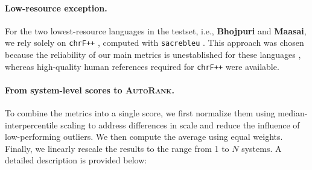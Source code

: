 \documentclass[11pt]{article}
\newcommand{\auto}{\textsc{AutoRank}}
\begin{document}
\paragraph{Low-resource exception.}
For the two lowest-resource languages in the testset, i.e., \textbf{Bhojpuri} and \textbf{Maasai}, we rely solely on \texttt{chrF++} \citep{popovic-2017-chrf}, computed with \texttt{sacrebleu} \citep{post-2018-call}. This approach was chosen because the reliability of our main metrics is unestablished for these languages \citep{falcao-etal-2024-comet,singh-etal-2024-good,wang-etal-2024-evaluating,sindhujan-etal-2025-llms}, whereas high-quality human references required for \texttt{chrF++} were available.

\paragraph{From system-level scores to \auto.}
To combine the metrics into a single score, we first normalize them using median-interpercentile scaling to address differences in scale and reduce the influence of low-performing outliers.
We then compute the average using equal weights. Finally, we linearly rescale the results to the range from 1 to $N$ systems. A detailed description is provided below:
\end{document}
